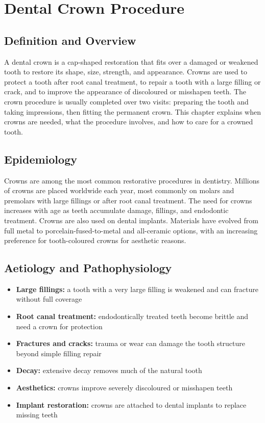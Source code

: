 \chapter{Dental Crown Procedure}

\section*{Definition and Overview}
A dental crown is a cap-shaped restoration that fits over a damaged or weakened tooth to restore its shape, size, strength, and appearance. Crowns are used to protect a tooth after root canal treatment, to repair a tooth with a large filling or crack, and to improve the appearance of discoloured or misshapen teeth. The crown procedure is usually completed over two visits: preparing the tooth and taking impressions, then fitting the permanent crown. This chapter explains when crowns are needed, what the procedure involves, and how to care for a crowned tooth.

\section*{Epidemiology}
Crowns are among the most common restorative procedures in dentistry. Millions of crowns are placed worldwide each year, most commonly on molars and premolars with large fillings or after root canal treatment. The need for crowns increases with age as teeth accumulate damage, fillings, and endodontic treatment. Crowns are also used on dental implants. Materials have evolved from full metal to porcelain-fused-to-metal and all-ceramic options, with an increasing preference for tooth-coloured crowns for aesthetic reasons.

\section*{Aetiology and Pathophysiology}
\begin{itemize}
    \item \textbf{Large fillings:} a tooth with a very large filling is weakened and can fracture without full coverage
    \item \textbf{Root canal treatment:} endodontically treated teeth become brittle and need a crown for protection
    \item \textbf{Fractures and cracks:} trauma or wear can damage the tooth structure beyond simple filling repair
    \item \textbf{Decay:} extensive decay removes much of the natural tooth
    \item \textbf{Aesthetics:} crowns improve severely discoloured or misshapen teeth
    \item \textbf{Implant restoration:} crowns are attached to dental implants to replace missing teeth
\end{itemize}

